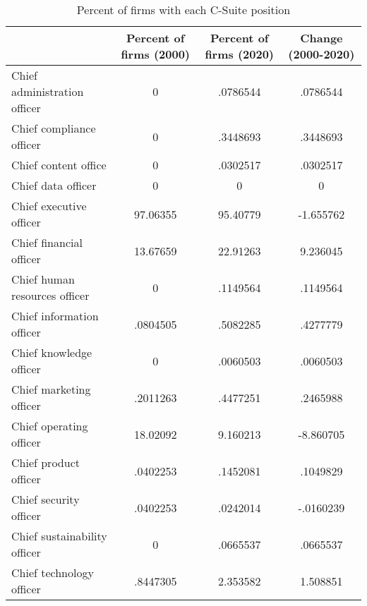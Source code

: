 \begin{table}[htbp]\centering
\caption{Percent of firms with each C-Suite position\label{tab98}}
\begin{tabular}{l*{3}{c}}
\toprule
                    &Percent of firms (2000)&Percent of firms (2020)&Change (2000-2020)\\
\midrule
Chief administration officer&           0&    .0786544&    .0786544\\
Chief compliance officer&           0&    .3448693&    .3448693\\
Chief content office&           0&    .0302517&    .0302517\\
Chief data officer  &           0&           0&           0\\
Chief executive officer&    97.06355&    95.40779&   -1.655762\\
Chief financial officer&    13.67659&    22.91263&    9.236045\\
Chief human resources officer&           0&    .1149564&    .1149564\\
Chief information officer&    .0804505&    .5082285&    .4277779\\
Chief knowledge officer&           0&    .0060503&    .0060503\\
Chief marketing officer&    .2011263&    .4477251&    .2465988\\
Chief operating officer&    18.02092&    9.160213&   -8.860705\\
Chief product officer&    .0402253&    .1452081&    .1049829\\
Chief security officer&    .0402253&    .0242014&   -.0160239\\
Chief sustainability officer&           0&    .0665537&    .0665537\\
Chief technology officer&    .8447305&    2.353582&    1.508851\\
\bottomrule
\end{tabular}
\end{table}
